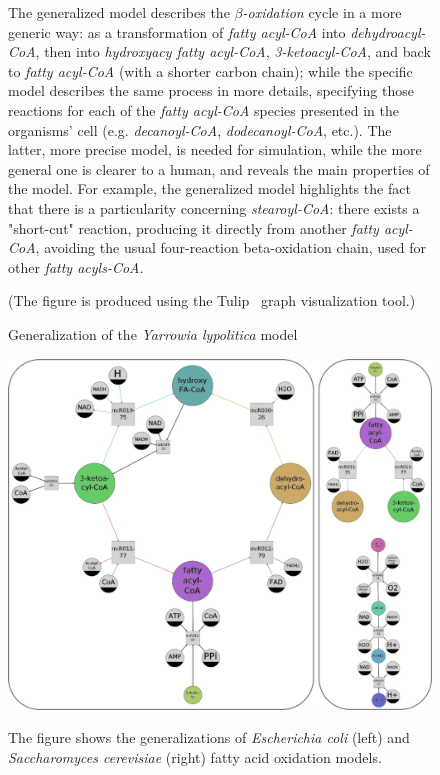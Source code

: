 \documentclass[10pt]{bmc_article}
\newenvironment{bmcformat}{\baselineskip20pt\sloppy\setboolean{publ}{false}}{\baselineskip20pt\sloppy}
\begin{document}
\begin{bmcformat}
\begin{figure}
      The generalized model describes the \textit{$\beta$-oxidation} cycle in a more generic way: as a transformation of \textit{fatty acyl-CoA} into \textit{dehydroacyl-CoA}, then into \textit{hydroxyacy fatty acyl-CoA}, \textit{3-ketoacyl-CoA}, and back to \textit{fatty acyl-CoA} (with a shorter carbon chain); while the specific model describes the same process in more details, specifying those reactions for each of the \textit{fatty acyl-CoA} species presented in the organisms' cell (e.g. \textit{decanoyl-CoA}, \textit{dodecanoyl-CoA}, etc.). The latter, more precise model, is needed for simulation, while the more general one is clearer to a human, and reveals the main properties of the model. For example, the generalized model highlights the fact that there is a particularity concerning \textit{stearoyl-CoA}: there exists a "short-cut" reaction, producing it directly from another \textit{fatty acyl-CoA}, avoiding the usual four-reaction beta-oxidation chain, used for other \textit{fatty acyls-CoA}.
      
      (The figure is produced using the Tulip~\cite{Auber04} graph visualization tool.)
\caption{Generalization of the \textit{Yarrowia lypolitica} model}
\label{fig:yali}
\end{figure}

\begin{figure}
\includegraphics[]{pics/sace_ecoli.png} 

      The figure shows the generalizations of \textit{Escherichia coli} (left) and \textit{Saccharomyces cerevisiae} (right) fatty acid oxidation models.
      

\end{figure}
\end{bmcformat}
\end{document}

